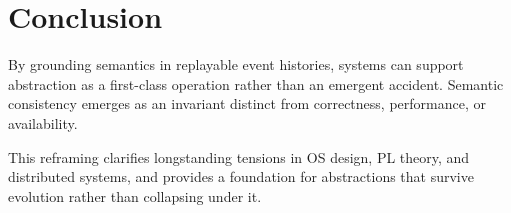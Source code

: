 \documentclass[11pt]{article}
\begin{document}
\section{Conclusion}

By grounding semantics in replayable event histories, systems can support abstraction as a first-class operation rather than an emergent accident. Semantic consistency emerges as an invariant distinct from correctness, performance, or availability.

This reframing clarifies longstanding tensions in OS design, PL theory, and distributed systems, and provides a foundation for abstractions that survive evolution rather than collapsing under it.
\end{document}
